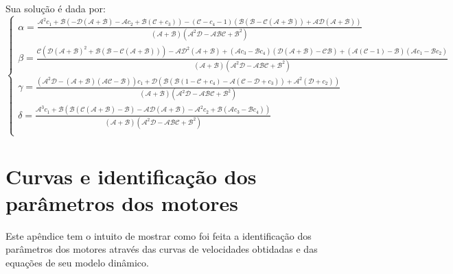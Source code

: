 \documentclass[]{politex}
\begin{document}
Sua solução é dada por:
\begin{equation}
\begin{cases}
\alpha = \frac{\mathcal{A}^2 c_1+\mathcal{B} \left(-\mathcal{D} (\mathcal{A}+\mathcal{B})-\mathcal{A} c_2+ \mathcal{B} (\mathcal{C}+ c_3) \right)-\left(\mathcal{C} -c_4 - 1 \right) (\mathcal{B} (\mathcal{B}-\mathcal{C} (\mathcal{A}+\mathcal{B}))+\mathcal{A} \mathcal{D} (\mathcal{A}+\mathcal{B}))}{(\mathcal{A}+\mathcal{B}) \left(\mathcal{A}^2 \mathcal{D}-\mathcal{A} \mathcal{B} \mathcal{C}+\mathcal{B}^2\right)} \\
\beta = \frac{\mathcal{C} \left( \mathcal{D} (\mathcal{A}+\mathcal{B})^2+ \mathcal{B} (\mathcal{B}-\mathcal{C} (\mathcal{A}+\mathcal{B})) \right)-\mathcal{A} \mathcal{D}^2 (\mathcal{A}+\mathcal{B})+\left(\mathcal{A} c_3- \mathcal{B} c_4 \right) (\mathcal{D} (\mathcal{A}+\mathcal{B})-\mathcal{C} \mathcal{B})+ (\mathcal{A} (\mathcal{C}-1)-\mathcal{B})(\mathcal{A} c_1 - \mathcal{B} c_2)}{(\mathcal{A}+\mathcal{B}) \left(\mathcal{A}^2 \mathcal{D}-\mathcal{A} \mathcal{B} \mathcal{C}+\mathcal{B}^2\right)} \\
\gamma = \frac{ \left(\mathcal{A}^2 \mathcal{D}-(\mathcal{A}+\mathcal{B}) (\mathcal{A} \mathcal{C}-\mathcal{B})\right)c_1 +\mathcal{D} \left(\mathcal{B} \left( \mathcal{B} (1-\mathcal{C} + c_4) - \mathcal{A} (\mathcal{C} - \mathcal{D} + c_3) \right)+\mathcal{A}^2( \mathcal{D}+ c_2) \right)}{(\mathcal{A}+\mathcal{B}) \left(\mathcal{A}^2 \mathcal{D}-\mathcal{A} \mathcal{B} \mathcal{C}+\mathcal{B}^2\right)} \\
\delta = \frac{\mathcal{A}^3 c_1+\mathcal{B} \left(\mathcal{B} (\mathcal{C} (\mathcal{A}+\mathcal{B})-\mathcal{B})-\mathcal{A} \mathcal{D} (\mathcal{A}+\mathcal{B})-\mathcal{A}^2 c_2 +\mathcal{B} \left(\mathcal{A} c_3- \mathcal{B} c_4 \right)\right)}{(\mathcal{A}+\mathcal{B}) \left(\mathcal{A}^2 \mathcal{D}-\mathcal{A} \mathcal{B} \mathcal{C}+\mathcal{B}^2\right)} \\
\end{cases}
\end{equation}



\chapter{Curvas e identificação dos parâmetros dos motores} \label{ap:CurvaDosMotores}

Este apêndice tem o intuito de mostrar como foi feita a identificação dos parâmetros dos motores através das curvas de velocidades obtidadas e das equações de seu modelo dinâmico. \\
\end{document}
